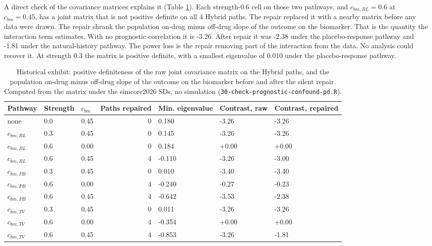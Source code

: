 \documentclass[
  11pt,
]{article}
\newcounter{none} %
\begin{document}
A direct check of the covariance matrices explains it (Table
\ref{tab:tab-pd}). Each strength-0.6 cell on those two pathways, and
\(c_{bm,BL} = 0.6\) at \(c_{bm} = 0.45\), has a joint matrix that is not
positive definite on all 4 Hybrid paths. The repair
replaced it with a nearby matrix before any data were drawn. The
repair shrank the population on-drug minus off-drug slope of the
outcome on the biomarker. That is the quantity the interaction term
estimates. With no prognostic correlation it is -3.26.
After repair it was -2.38 under the placebo-response
pathway and -1.81 under the natural-history pathway. The
power loss is the repair removing part of the interaction from the
data. No analysis could recover it. At strength 0.3 the matrix is
positive definite, with a smallest eigenvalue of 0.010
under the placebo-response pathway.

\begin{table}
\centering
\caption{\label{tab:tab-pd}Historical exhibit: positive definiteness of the raw
      joint covariance matrix on the Hybrid paths, and the population
      on-drug minus off-drug slope of the outcome on the biomarker
      before and after the silent repair. Computed from the matrix
      under the simcore2026 SDs, no simulation
      (\texttt{30-check-prognostic-confound-pd.R}).}
\centering
\fontsize{9}{11}\selectfont
\begin{tabular}[t]{lllrlll}
\toprule
Pathway & Strength & $c_{bm}$ & Paths repaired & Min. eigenvalue & Contrast, raw & Contrast, repaired\\
\midrule
none & 0.0 & 0.45 & 0 & 0.180 & -3.26 & -3.26\\
$c_{bm,BL}$ & 0.3 & 0.45 & 0 & 0.145 & -3.26 & -3.26\\
$c_{bm,BL}$ & 0.6 & 0.00 & 0 & 0.184 & +0.00 & +0.00\\
$c_{bm,BL}$ & 0.6 & 0.45 & 4 & -0.110 & -3.26 & -3.00\\
$c_{bm,PB}$ & 0.3 & 0.45 & 0 & 0.010 & -3.40 & -3.40\\
$c_{bm,PB}$ & 0.6 & 0.00 & 4 & -0.240 & -0.27 & -0.23\\
$c_{bm,PB}$ & 0.6 & 0.45 & 4 & -0.642 & -3.53 & -2.38\\
$c_{bm,TV}$ & 0.3 & 0.45 & 0 & 0.011 & -3.26 & -3.26\\
$c_{bm,TV}$ & 0.6 & 0.00 & 4 & -0.354 & +0.00 & +0.00\\
$c_{bm,TV}$ & 0.6 & 0.45 & 4 & -0.853 & -3.26 & -1.81\\
\bottomrule
\end{tabular}
\end{table}
\end{document}
